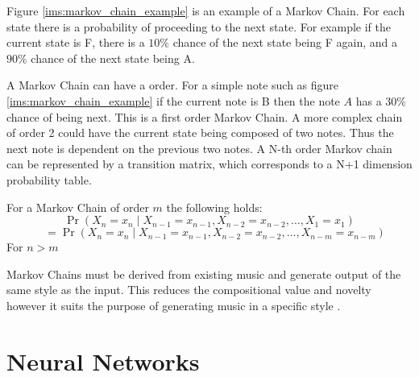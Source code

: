 Figure \ref{ims:markov_chain_example} is an example of a Markov Chain. For each state there is a probability of proceeding to the next state. For example if the current state is F, there is a $10\%$ chance of the next state being F again, and a $90\%$ chance of the next state being A.

A Markov Chain can have a order. For a simple note such as figure \ref{ims:markov_chain_example} if the current note is B then the note $A$ has a $30\%$ chance of being next. This is a first order Markov Chain.  A more complex chain of order 2 could have the current state being composed of two notes. Thus the next note is dependent on the previous two notes. A N-th order Markov chain can be represented by a transition matrix, which corresponds to a N+1 dimension probability table.

For a Markov Chain of order $m$ the following holds:
\[
\Pr(X_n=x_n\mid X_{n-1}=x_{n-1}, X_{n-2}=x_{n-2}, \dots , X_1=x_1)
\]
\[\quad = \Pr(X_n=x_n\mid X_{n-1}=x_{n-1}, X_{n-2}=x_{n-2}, \dots, X_{n-m}=x_{n-m})
\]
For $n > m$


Markov Chains must be derived from existing music and generate output of the same style as the input. This reduces the compositional value and novelty however it suits the purpose of generating music in a specific style \cite{Jarvelainen2000}.




\section{Neural Networks}

